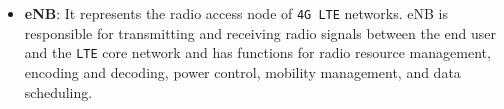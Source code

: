 \documentclass[english]{article}
\begin{document}
\begin{itemize}

	\item \textbf{\hypertarget{eNB}{eNB}}:
	      It represents the radio access node of \texttt{4G LTE} networks.\@
	      eNB is responsible for transmitting and receiving radio signals
	      between the end user and the \texttt{LTE} core network and has
	      functions for radio resource management, encoding and decoding,
	      power control, mobility management, and data scheduling.


\end{itemize}
\end{document}
